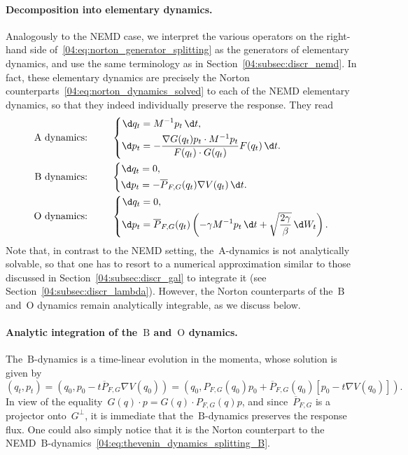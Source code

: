 \paragraph{Decomposition into elementary dynamics.}
Analogously to the NEMD case, we interpret the various operators on the right-hand side of~\eqref{04:eq:norton_generator_splitting} as the generators of  elementary dynamics, and use the same terminology as in Section~\ref{04:subsec:discr_nemd}. In fact, these elementary dynamics are precisely the Norton counterparts~\eqref{04:eq:norton_dynamics_solved} to each of the NEMD elementary dynamics, so that they indeed individually preserve the response. They read
\begin{equation}\label{04:eq:norton_elem_dynamics}
   \begin{aligned}
        \text{$\mathrm{A}$ dynamics: }\qquad&\left\{\begin{aligned}
            \d q_t &= M^{-1}p_t \,\d t,\\
            \d p_t &= -\frac{\nabla G(q_t)p_t\cdot M^{-1}p_t}{F(q_t)\cdot G(q_t)}F(q_t)\,\d t.
        \end{aligned}\right.\\
        \text{$\mathrm{B}$ dynamics: }\qquad&\left\{\begin{aligned}
            \d q_t &= 0,\\
            \d p_t &=-\overline{P}_{F,G}(q_t)\nabla V(q_t)\,\d t.
        \end{aligned}\right.\\
        \text{$\mathrm{O}$ dynamics: }\qquad&\left\{\begin{aligned}
            \d q_t &= 0,\\
            \d p_t &= \overline{P}_{F,G}(q_t)\left(-\gamma M^{-1}p_t\, \d t +\sqrt{\frac{2\gamma}\beta}\,\d W_t\right).
        \end{aligned}\right.
    \end{aligned}    
\end{equation}
 Note that, in contrast to the NEMD setting, the~$\mathrm{A}$-dynamics is not analytically solvable, so that one has to resort to a numerical approximation similar to those discussed in Section~\ref{04:subsec:discr_gal} to integrate it (see Section~\ref{04:subsec:discr_lambda}). However, the Norton counterparts of the~$\mathrm B$ and~$\mathrm O$ dynamics remain analytically integrable, as we discuss below.
\paragraph{Analytic integration of the~$\mathrm B$ and~$\mathrm O$ dynamics.}
The~$\mathrm{B}$-dynamics is a time-linear evolution in the momenta, whose solution is given by
\[(q_t,p_t)=\left(q_0, p_0 - t \overline{P}_{F,G}\nabla V(q_0)\right)=\left(q_0,P_{F,G}(q_0)p_0+\overline{P}_{F,G}(q_0)\left[p_0-t\nabla V(q_0)\right]\right).\]
In view of the equality~$G(q)\cdot p = G(q)\cdot {P}_{F,G}(q) p$, and since~$\overline{P}_{F,G}$ is a projector onto~$G^\perp$, it is immediate that the~$\mathrm{B}$-dynamics preserves the response flux. One could also simply notice that it is the Norton counterpart to the NEMD~$\mathrm{B}$-dynamics~\eqref{04:eq:thevenin_dynamics_splitting_B}.

